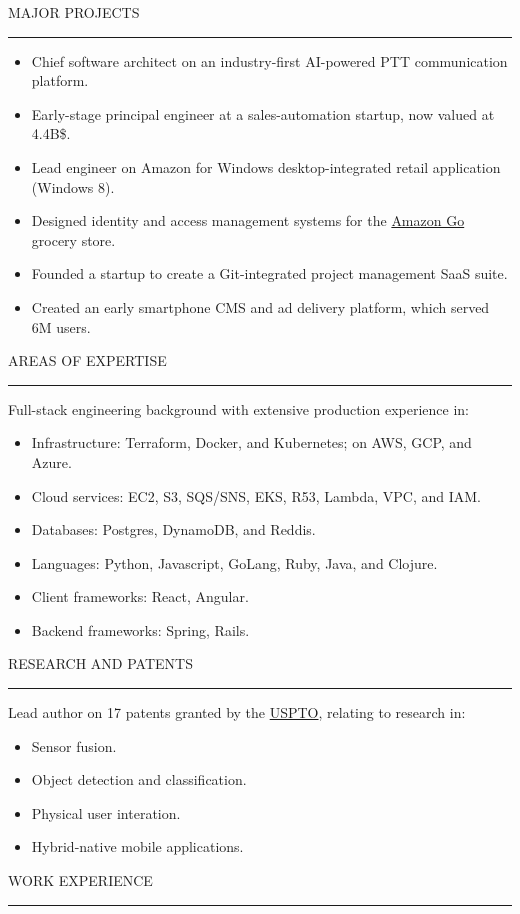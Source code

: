 \documentclass[12pt]{article}
\newcommand{\blockseparation}{\vspace{0.13in}}
\newcommand{\heading}[1]{
	\vspace{0.05in}
	\uppercase{#1}
	\vspace{0.05in}
	\hrule
	\blockseparation
}
\newcommand{\bulletheading}[1]{
	\vspace{0.075in}
	\hspace{0.1in}
	{#1}
	\vspace{0.03in}
}
\newenvironment{tightbullets}
{\begin{itemize}}
{\end{itemize}}
\newenvironment{bullets}
{\begin{tightbullets}}
{\end{tightbullets} \blockseparation}
\begin{document}
\begin{flushleft}
\heading{Major Projects}
\begin{bullets}
	\item Chief software architect on an industry-first AI-powered PTT communication platform.
	\item Early-stage principal engineer at a sales-automation startup, now valued at 4.4B\$.
	\item Lead engineer on Amazon for Windows desktop-integrated retail application (Windows 8).
	\item Designed identity and access management systems for the \href{https://www.amazon.com/b?ie=UTF8\&node=16008589011}{Amazon Go} grocery store.
	\item Founded a startup to create a Git-integrated project management SaaS suite.
	\item Created an early smartphone CMS and ad delivery platform, which served 6M users.
\end{bullets}


\heading{Areas of Expertise}
\bulletheading{Full-stack engineering background with extensive production experience in:}
\begin{bullets}
	\item Infrastructure: Terraform, Docker, and Kubernetes; on AWS, GCP, and Azure.
	\item Cloud services: EC2, S3, SQS/SNS, EKS, R53, Lambda, VPC, and IAM.
	\item Databases: Postgres, DynamoDB, and Reddis.
	\item Languages: Python, Javascript, GoLang, Ruby, Java, and Clojure.
	\item Client frameworks: React, Angular.
	\item Backend frameworks: Spring, Rails.
\end{bullets}


\heading{Research and Patents}
\bulletheading{Lead author on 17 patents granted by the \href{https://patents.google.com/?inventor=McNamara+Alexander+Michael}{USPTO}, relating to research in:}
\begin{bullets}
	\item Sensor fusion.
	\item Object detection and classification.
	\item Physical user interation.
	\item Hybrid-native mobile applications.
\end{bullets}

\pagebreak

\heading{Work Experience}
\vspace{0.05in}


\end{flushleft}
\end{document}

